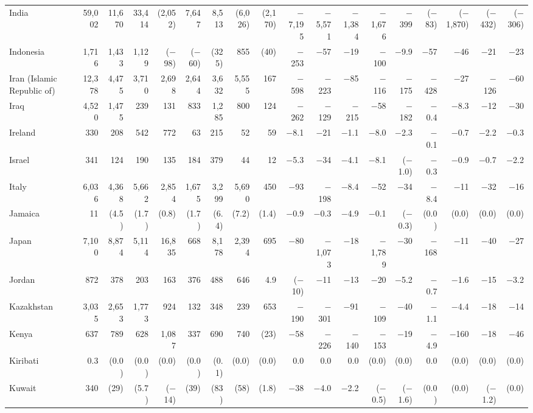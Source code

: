 \begin{longtable}{lrrrrrrrrrrrrrrrrr}
India & 59,002 & 11,670 & 33,414 & (2,052) & 7,647 & 8,513 & (6,026) & (2,170) & $-$7,195 & $-$5,571 & $-$1,384 & $-$1,676 & $-$399 & ($-$83) & ($-$1,870) & ($-$432) & ($-$306) \\
Indonesia & 1,716 & 1,433 & 1,129 & ($-$98) & ($-$60) & (325) & 855 & (40) & $-$253 & $-$57 & $-$19 & $-$100 & $-$9.9 & $-$57 & $-$46 & $-$21 & $-$23 \\
Iran (Islamic Republic of) & 12,378 & 4,475 & 3,710 & 2,698 & 2,644 & 3,632 & 5,555 & 167 & $-$598 & $-$223 & $-$85 & $-$116 & $-$175 & $-$428 & $-$27 & $-$126 & $-$60 \\
Iraq & 4,520 & 1,475 & 239 & 131 & 833 & 1,285 & 800 & 124 & $-$262 & $-$129 & $-$215 & $-$58 & $-$182 & $-$0.4 & $-$8.3 & $-$12 & $-$30 \\
Ireland & 330 & 208 & 542 & 772 & 63 & 215 & 52 & 59 & $-$8.1 & $-$21 & $-$1.1 & $-$8.0 & $-$2.3 & $-$0.1 & $-$0.7 & $-$2.2 & $-$0.3 \\
Israel & 341 & 124 & 190 & 135 & 184 & 379 & 44 & 12 & $-$5.3 & $-$34 & $-$4.1 & $-$8.1 & ($-$1.0) & $-$0.3 & $-$0.9 & $-$0.7 & $-$2.2 \\
Italy & 6,036 & 4,368 & 5,662 & 2,854 & 1,675 & 3,299 & 5,690 & 450 & $-$93 & $-$198 & $-$8.4 & $-$52 & $-$34 & $-$8.4 & $-$11 & $-$32 & $-$16 \\
Jamaica & 11 & (4.5) & (1.7) & (0.8) & (1.7) & (6.4) & (7.2) & (1.4) & $-$0.9 & $-$0.3 & $-$4.9 & $-$0.1 & ($-$0.3) & (0.0) & (0.0) & (0.0) & (0.0) \\
Japan & 7,100 & 8,874 & 5,114 & 16,835 & 668 & 8,178 & 2,394 & 695 & $-$80 & $-$1,073 & $-$18 & $-$1,789 & $-$30 & $-$168 & $-$11 & $-$40 & $-$27 \\
Jordan & 872 & 378 & 203 & 163 & 376 & 488 & 646 & 4.9 & ($-$10) & $-$11 & $-$13 & $-$20 & $-$5.2 & $-$0.7 & $-$1.6 & $-$15 & $-$3.2 \\
Kazakhstan & 3,035 & 2,653 & 1,773 & 924 & 132 & 348 & 239 & 653 & $-$190 & $-$301 & $-$91 & $-$109 & $-$40 & $-$1.1 & $-$4.4 & $-$18 & $-$14 \\
Kenya & 637 & 789 & 628 & 1,087 & 337 & 690 & 740 & (23) & $-$58 & $-$226 & $-$140 & $-$153 & $-$19 & $-$4.9 & $-$160 & $-$18 & $-$46 \\
Kiribati & 0.3 & (0.0) & (0.0) & (0.0) & (0.0) & (0.1) & (0.0) & (0.0) & 0.0 & 0.0 & 0.0 & (0.0) & (0.0) & 0.0 & (0.0) & (0.0) & (0.0) \\
Kuwait & 340 & (29) & (5.7) & ($-$14) & (39) & (83) & (58) & (1.8) & $-$38 & $-$4.0 & $-$2.2 & ($-$0.5) & ($-$1.6) & (0.0) & (0.0) & ($-$1.2) & (0.0) \\

\end{longtable}
